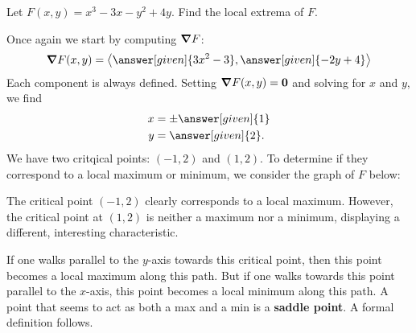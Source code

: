 \documentclass{ximera}
\begin{document}
\begin{example}
  Let $F(x,y) = x^3-3x-y^2+4y$. Find the local extrema of $F$.
  \begin{explanation}
    Once again we start by computing $\boldsymbol\nabla F$:
    \[
    \grad F(x,y) = \vector{\answer[given]{3x^2-3},\answer[given]{-2y+4}}
    \]
    Each component is always defined. Setting $\boldsymbol\nabla F(x,y) = \mathbf{0}$
    and solving for $x$ and $y$, we find
    \begin{align*}
      x &=\pm \answer[given]{1}\\
      y &= \answer[given]{2}.
    \end{align*}
    We have two critqical points: $(-1,2)$ and $(1,2)$. To determine
    if they correspond to a local maximum or minimum, we consider the
    graph of $F$ below:
    \begin{image}
    \end{image}


    The critical point $(-1,2)$ clearly corresponds to a local
    maximum. However, the critical point at $(1,2)$ is neither a
    maximum nor a minimum, displaying a different, interesting
    characteristic.

    If one walks parallel to the $y$-axis towards this critical point,
    then this point becomes a local maximum along this path. But if
    one walks towards this point parallel to the $x$-axis, this point
    becomes a local minimum along this path. A point that seems to act
    as both a max and a min is a \textbf{saddle point}. A formal
    definition follows.
  \end{explanation}
\end{example}
\end{document}
